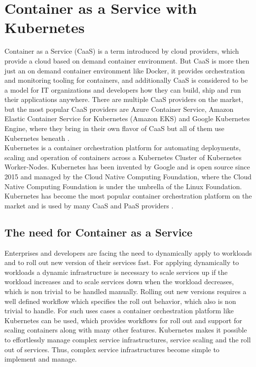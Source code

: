 \chapter{Container as a Service with Kubernetes}
\label{cha:caas}
Container as a Service (CaaS) is a term introduced by cloud providers, which provide a cloud based on demand container environment. But CaaS is more then just an on demand container environment like Docker, it provides orchestration and monitoring tooling for containers, and additionally CaaS is considered to be a model for IT organizations and developers how they can build, ship and run their applications anywhere. There are multiple CaaS providers on the market, but the most popular CaaS providers are Azure Container Service, Amazon Elastic Container Service for Kubernetes (Amazon EKS) and Google Kubernetes Engine, where they bring in their own flavor of CaaS but all of them use Kubernetes beneath  \cite{CNCFKubernetes2018, MicrosoftAzureAKS2018, AmazonWebServicesEKS2018, GoogleCloudKE2018}. \\

Kubernetes is a container orchestration platform for automating deployments, scaling and operation of containers across a Kubernetes Cluster of Kubernetes Worker-Nodes. Kubernetes has been invented by Google and is open source since 2015 and managed by the Cloud Native Computing Foundation, where the Cloud Native Computing Foundation is under the umbrella of the Linux Foundation. Kubernetes has become the most popular container orchestration platform on the market and is used by many CaaS and PaaS providers \cite{CNCF2018}.

\section{The need for Container as a Service}
\label{sec:caas-need-for-caas}
Enterprises and developers are facing the need to dynamically apply to workloads and to roll out new version of their services fast. For applying dynamically to workloads a dynamic infrastructure is necessary to scale services up if the workload increases and to scale services down when the workload decreases, which is non trivial to be handled manually. Rolling out new versions requires a well defined workflow which specifies the roll out behavior, which also is non trivial to handle. For such uses cases a container orchestration platform like Kubernetes can be used, which provides workflows for roll out and support for scaling containers along with many other features. Kubernetes makes it possible to effortlessly manage complex service infrastructures, service scaling and the roll out of services. Thus, complex service infrastructures become simple to implement and manage. \\

